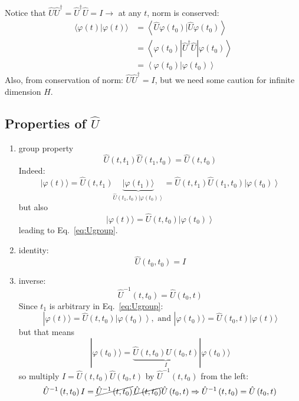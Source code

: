 \documentclass[12pt]{article}
\begin{document}
Notice that $\hat{U} \hat{U}^{\dagger} = \hat{U}^{\dagger}\hat{U} = I \to$ at any $t$, norm is conserved:
\begin{equation}
\begin{aligned}
\langle\varphi(t) | \varphi(t)\rangle 
&=\left\langle\hat{U} \varphi\left(t_{0}\right) | \hat{U} \varphi\left(t_{0}\right)\right\rangle \\ 
&=\left\langle\varphi\left(t_{0}\right)\left|\hat{U}^{\dagger} \hat{U}\right| \varphi\left(t_{0}\right)\right\rangle \\ 
&=\left\langle\varphi\left(t_{0}\right) | \varphi\left(t_{0}\right)\right\rangle 
\end{aligned}
\end{equation}
Also, from conservation of norm: $\hat{U} \hat{U}^{\dagger} = I$, but we need some caution for infinite dimension $H$.


\subsection{\texorpdfstring{Properties of $\hat{U}$}{Properties of U}}

\begin{enumerate}
\item group property
\begin{equation}
\hat{U}\left(t, t_{1}\right) \hat{U}\left(t_{1}, t_{0}\right)=\hat{U}\left(t, t_{0}\right)
\label{eq:Ugroup}
\end{equation}
Indeed:
\[
|\varphi(t)\rangle=
\hat{U}\left(t, t_{1}\right)\underbrace{|\varphi\left(t_{1}\right)\rangle}%
_{\hat{U}\left(t_{1}, t_{0}\right)\left|\varphi\left(t_{0}\right)\right\rangle}
=\hat{U}\left(t, t_{1}\right) \hat{U}\left(t_{1}, t_{0}\right)\left|\varphi\left(t_{0}\right)\right\rangle
\]
but also 
\[
|\varphi(t)\rangle = \hat{U}\left(t, t_{0}\right)\left|\varphi\left(t_{0}\right)\right\rangle
\]
leading to Eq.~\eqref{eq:Ugroup}.
%
\item identity: 
\begin{equation}
\hat{U}(t_0,t_0) = I
\end{equation}
%
\item inverse:
\begin{equation}
\hat{U}^{-1}\left(t, t_{0}\right)=\hat{U}\left(t_{0}, t\right)
\end{equation}
Since $t_1$ is arbitrary in Eq.~\eqref{eq:Ugroup}:
\[
|\varphi(t)\rangle    =\hat{U}\left(t, t_{0}\right)\left|\varphi\left(t_{0}\right)\right\rangle,
\text{ and }
|\varphi(t_{0})\rangle=\hat{U}\left(t_{0}, t\right)|\varphi(t)\rangle
\]
but that means
\[
|\varphi(t_0)\rangle = \underbrace{\hat{U}\left(t, t_{0}\right) \hat{U}\left(t_{0}, t\right)}%
_{I}%
|\varphi(t_0)\rangle
\]
so multiply 
$I = \hat{U}\left(t, t_{0}\right) \hat{U}\left(t_{0}, t\right)$
by $\hat{U}^{-1}\left(t, t_{0}\right)$ from the left:
\[
\hat{U}^{-1}\left(t, t_{0}\right) I = 
\cancel{\hat{U}^{-1}\left(t, t_{0}\right)}\,%
\cancel{\hat{U}\left(t, t_{0}\right)}
\hat{U}\left(t_{0}, t\right) 
\Rightarrow \hat{U}^{-1}\left(t, t_{0}\right)
=\hat{U}\left(t_{0}, t\right)
\]
\end{enumerate}
\end{document}
